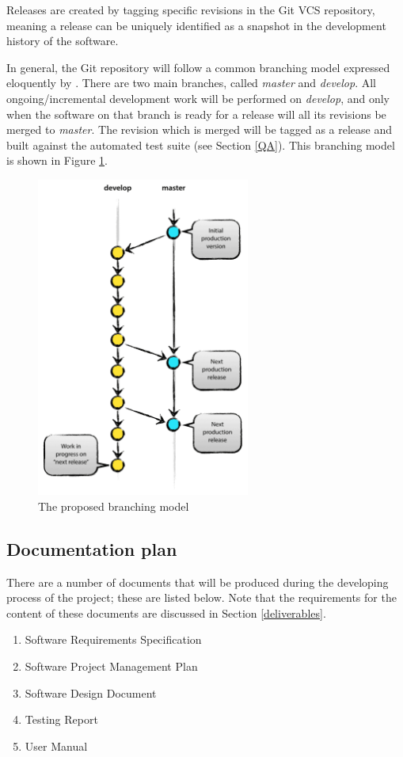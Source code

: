 \documentclass[12pt]{article}
\begin{document}
Releases are created by tagging specific revisions in the Git VCS repository, meaning a release can be uniquely identified as a snapshot in the development history of the software.

In general, the Git repository will follow a common branching model expressed eloquently by \cite{driessen}. There are two main branches, called \textit{master} and \textit{develop}. All ongoing/incremental development work will be performed on \textit{develop}, and only when the software on that branch is ready for a release will all its revisions be merged to \textit{master}. The revision which is merged will be tagged as a release and built against the automated test suite (see Section \ref{QA}). This branching model is shown in Figure \ref{fig:branches}.

\begin{figure}[h!]
\centering\includegraphics[width=7cm]{branches.png}
\caption{The proposed branching model \cite{driessen}}
  \label{fig:branches}
\end{figure}


\subsection{Documentation plan}
There are a number of documents that will be produced during the developing process of the project; these are listed below. Note that the requirements for the content of these documents are discussed in Section \ref{deliverables}.

\begin{enumerate}{}
\item{Software Requirements Specification} 

\item{Software Project Management Plan} 

\item{Software Design Document} 

\item{Testing Report} 

\item{User Manual} 

\end{enumerate}
\end{document}

